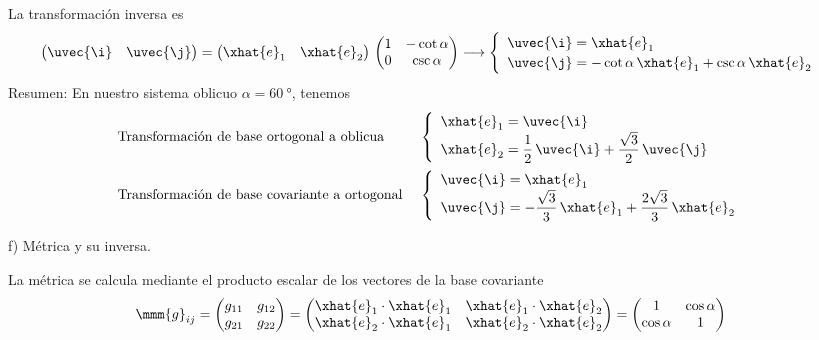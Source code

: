 La transformación inversa es
\[
  \begin{pmatrix}
    \uvec{\i} & \uvec{\j}                 
  \end{pmatrix}
  =\begin{pmatrix}
    \xhat{e}_1 & \xhat{e}_2
  \end{pmatrix}
  \,\begin{pmatrix}
    1 & -\cot\alpha\\
    0 & \csc\alpha
  \end{pmatrix}
  \longrightarrow
  \begin{cases}
    \begin{array}{l}
      \uvec{\i} = \xhat{e}_1\\
      \uvec{\j} = -\cot\alpha\,\xhat{e}_1 + \csc\alpha\,\xhat{e}_2
    \end{array}
  \end{cases}
\]
Resumen: En nuestro sistema oblicuo $\alpha=\qty{60}{\degree}$, tenemos
\[
  \begin{array}{ll}
  \text{Transformación de base ortogonal a oblicua }&
  \begin{cases}
    \begin{array}{l}
      \xhat{e}_1 = \uvec{\i}\\
      \xhat{e}_2 = \dfrac{1}{2}\,\uvec{\i} + \dfrac{\sqrt{3}}{2}\,\uvec{\j}
    \end{array}
  \end{cases}\\[4ex]
  \text{Transformación de base covariante a ortogonal }&
  \begin{cases}
    \begin{array}{l}
      \uvec{\i} = \xhat{e}_1\\
      \uvec{\j} = -\dfrac{\sqrt{3}}{3}\,\xhat{e}_1 + \dfrac{2\sqrt{3}}{3}\,\xhat{e}_2
    \end{array}
  \end{cases}
  \end{array}
\]

\noindent
f) Métrica y su inversa.

La métrica se calcula mediante el producto escalar de los vectores de la base covariante
\begin{align*}
  \mmm{g}_{ij}
  &=
    \begin{pmatrix}
      g_{11} & g_{12}\\
      g_{21} & g_{22}
    \end{pmatrix}
    = \begin{pmatrix}
      \xhat{e}_1\cdot \xhat{e}_1 & \xhat{e}_1\cdot\xhat{e}_2\\
      \xhat{e}_2\cdot \xhat{e}_1 & \xhat{e}_2\cdot\xhat{e}_2
    \end{pmatrix}
    = \begin{pmatrix}
      1 & \cos\alpha\\
      \cos\alpha & 1
    \end{pmatrix}
\end{align*}

